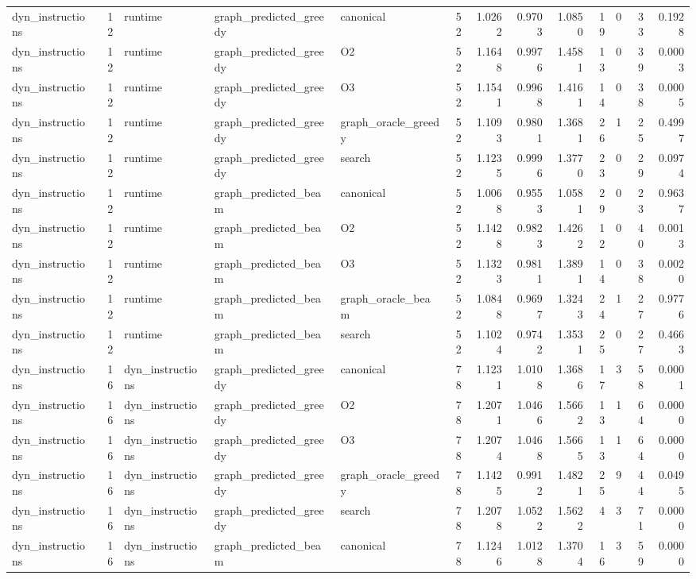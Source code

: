 \begin{table}[t]
\begin{tabular}{lrlllrrrrrrrr}
dyn\_instructions & 12 & runtime & graph\_predicted\_greedy & canonical & 52 & 1.0262 & 0.9703 & 1.0850 & 19 & 0 & 33 & 0.1928 \\
dyn\_instructions & 12 & runtime & graph\_predicted\_greedy & O2 & 52 & 1.1648 & 0.9976 & 1.4581 & 13 & 0 & 39 & 0.0003 \\
dyn\_instructions & 12 & runtime & graph\_predicted\_greedy & O3 & 52 & 1.1541 & 0.9968 & 1.4161 & 14 & 0 & 38 & 0.0005 \\
dyn\_instructions & 12 & runtime & graph\_predicted\_greedy & graph\_oracle\_greedy & 52 & 1.1093 & 0.9801 & 1.3681 & 26 & 1 & 25 & 0.4997 \\
dyn\_instructions & 12 & runtime & graph\_predicted\_greedy & search & 52 & 1.1235 & 0.9996 & 1.3770 & 23 & 0 & 29 & 0.0974 \\
dyn\_instructions & 12 & runtime & graph\_predicted\_beam & canonical & 52 & 1.0068 & 0.9553 & 1.0581 & 29 & 0 & 23 & 0.9637 \\
dyn\_instructions & 12 & runtime & graph\_predicted\_beam & O2 & 52 & 1.1428 & 0.9823 & 1.4262 & 12 & 0 & 40 & 0.0013 \\
dyn\_instructions & 12 & runtime & graph\_predicted\_beam & O3 & 52 & 1.1323 & 0.9811 & 1.3891 & 14 & 0 & 38 & 0.0020 \\
dyn\_instructions & 12 & runtime & graph\_predicted\_beam & graph\_oracle\_beam & 52 & 1.0848 & 0.9697 & 1.3243 & 24 & 1 & 27 & 0.9776 \\
dyn\_instructions & 12 & runtime & graph\_predicted\_beam & search & 52 & 1.1024 & 0.9742 & 1.3531 & 25 & 0 & 27 & 0.4663 \\
dyn\_instructions & 16 & dyn\_instructions & graph\_predicted\_greedy & canonical & 78 & 1.1231 & 1.0108 & 1.3686 & 17 & 3 & 58 & 0.0001 \\
dyn\_instructions & 16 & dyn\_instructions & graph\_predicted\_greedy & O2 & 78 & 1.2071 & 1.0466 & 1.5662 & 13 & 1 & 64 & 0.0000 \\
dyn\_instructions & 16 & dyn\_instructions & graph\_predicted\_greedy & O3 & 78 & 1.2074 & 1.0468 & 1.5665 & 13 & 1 & 64 & 0.0000 \\
dyn\_instructions & 16 & dyn\_instructions & graph\_predicted\_greedy & graph\_oracle\_greedy & 78 & 1.1425 & 0.9912 & 1.4821 & 25 & 9 & 44 & 0.0495 \\
dyn\_instructions & 16 & dyn\_instructions & graph\_predicted\_greedy & search & 78 & 1.2078 & 1.0522 & 1.5622 & 4 & 3 & 71 & 0.0000 \\
dyn\_instructions & 16 & dyn\_instructions & graph\_predicted\_beam & canonical & 78 & 1.1246 & 1.0128 & 1.3704 & 16 & 3 & 59 & 0.0000 \\

\end{tabular}
\end{table}

